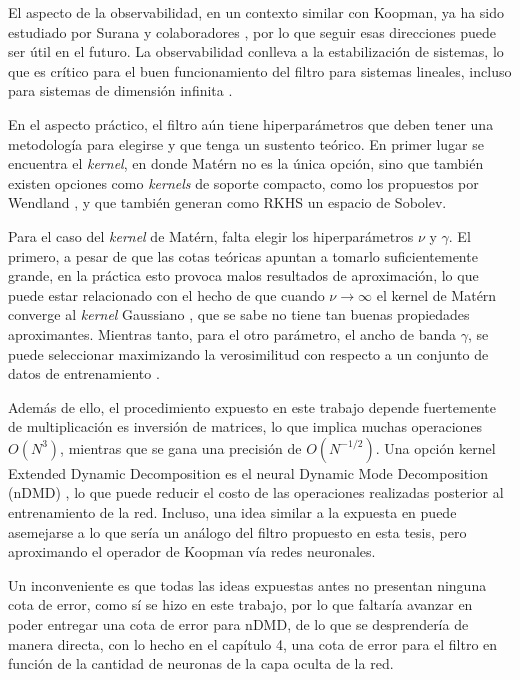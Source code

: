 El aspecto de la observabilidad, en un contexto similar con Koopman, ya ha sido estudiado por Surana y colaboradores \cite{Surana2016LinearFramework}, por lo que seguir esas direcciones puede ser útil en el futuro. La observabilidad conlleva a la estabilización de sistemas, lo que es crítico para el buen funcionamiento del filtro para sistemas lineales, incluso para sistemas de dimensión infinita \cite{Afshar2024ExtendedSystems}.

En el aspecto práctico, el filtro aún tiene hiperparámetros que deben tener una metodología para elegirse y que tenga un sustento teórico. En primer lugar se encuentra el \textit{kernel}, en donde Matérn no es la única opción, sino que también existen opciones como \textit{kernels} de soporte compacto, como los propuestos por Wendland \cite{Wendland1995PiecewiseDegree}, y que también generan como RKHS un espacio de Sobolev.

Para el caso del \textit{kernel} de Matérn, falta elegir los hiperparámetros $\nu$ y $\gamma$. El primero, a pesar de que las cotas teóricas apuntan a tomarlo suficientemente grande, en la práctica esto provoca malos resultados de aproximación, lo que puede estar relacionado con el hecho de que cuando $\nu \to \infty$ el kernel de Matérn converge al \textit{kernel} Gaussiano \cite{Rasmussen2005GaussianLearning}, que se sabe no tiene tan buenas propiedades aproximantes. Mientras tanto, para el otro parámetro, el ancho de banda $\gamma$, se puede seleccionar maximizando la verosimilitud con respecto a un conjunto de datos de entrenamiento \cite{Rasmussen2005GaussianLearning}.

Además de ello, el procedimiento expuesto en este trabajo depende fuertemente de multiplicación es inversión de matrices, lo que implica muchas operaciones $O(N^3)$, mientras que se gana una precisión de $O(N^{-1/2})$. Una opción kernel Extended Dynamic Decomposition es el neural Dynamic Mode Decomposition (nDMD) \cite{Xiong2024KoopmanEquations, Frion2023LeveragingData, Terao2021ExtendedEquations}, lo que puede reducir el costo de las operaciones realizadas posterior al entrenamiento de la red. Incluso, una idea similar a la expuesta en \cite{Li2022Data-DrivenNetworks, Liu2024NeuralSystems, Garmaev2024DeepModelling} puede asemejarse a lo que sería un análogo del filtro propuesto en esta tesis, pero aproximando el operador de Koopman vía redes neuronales. 

Un inconveniente es que todas las ideas expuestas antes no presentan ninguna cota de error, como sí se hizo en este trabajo, por lo que faltaría avanzar en poder entregar una cota de error para nDMD, de lo que se desprendería de manera directa, con lo hecho en el capítulo 4, una cota de error para el filtro en función de la cantidad de neuronas de la capa oculta de la red.